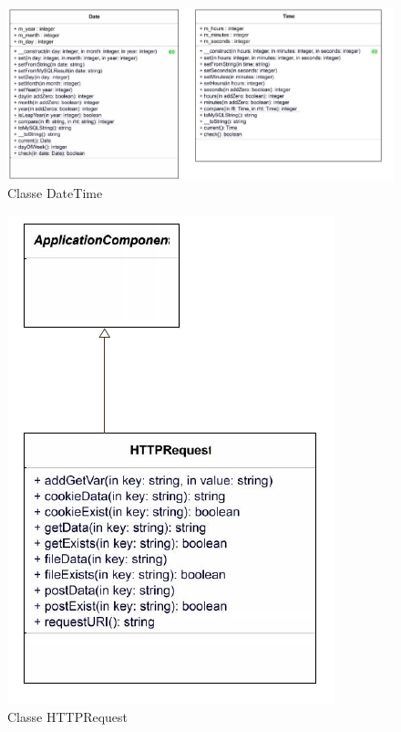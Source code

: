     \begin{figure}[h]
        \begin{center}
            \includegraphics[angle=90, scale=0.8]{images/uml/classes/DateTime.png} 
        \end{center}

        \caption{Classe DateTime}
        \label{Classe DateTime}
    \end{figure}


    \begin{figure}[h]
        \begin{center}
            \includegraphics[scale=1.0]{images/uml/classes/HTTPRequest.png} 
        \end{center}

        \caption{Classe HTTPRequest}
        \label{Classe HTTPRequest}
    \end{figure}


